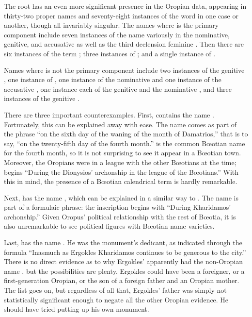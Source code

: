 The root  has an even more significant presence in the Oropian data,
appearing in thirty-two proper names and seventy-eight instances of the word  in one case or another,
though all invariably singular.
The names where  is the primary component include seven instances of the name  variously in the nominative, genitive, and accusative
as well as the third declension feminine .
Then there are six instances of the term ;
three instances of ;
and a single instance of .
	
Names where  is not the primary component include two instances of the genitive ,
one instance of ,
one instance of the nominative 
and one instance of the accusative ,
one instance each of the genitive  and the nominative ,
and three instances of the genitive .
	
There are three important counterexamples.
First,
 contains the name .
Fortunately,
this can be explained away with ease.
The name comes as part of the phrase 
``on the sixth day of the waning of the month of Damatrios,''
that is to say,
``on the twenty-fifth day of the fourth month.''
 is the common Bœotian name for the fourth month,
so it is not surprising to see it appear in a Bœotian town.
Moreover,
the Oropians were in a league with the other Bœotians at the time;
 begins 
``During the Dionysios' archonship in the league of the Bœotians.''
With this in mind,
the presence of a Bœotian calendrical term is hardly remarkable.

	
Next,
 has the name ,
which can be explained in a similar way to .
The name is part of a formulaic phrase:
the inscription begins with 
``During Kharidamos' archonship.''
Given Oropus' political relationship with the rest of Bœotia,
it is also unremarkable to see political figures with Bœotian name varieties.
	
Last,
 has the name .
He was the monument's dedicant,
as indicated through the formula 
``Inasmuch as Ergokles Kharidamos continues to be generous to the city.''
There is no direct evidence as to why Ergokles' apparently had the non-Oropian name ,
but the possibilities are plenty.
Ergokles could have been a foreigner,
or a first-generation Oropian,
or the son of a foreign father and an Oropian mother.
The list goes on,
but regardless of all that,
Ergokles' father was simply not statistically significant enough to negate all the other Oropian evidence.
He should have tried putting up his own monument.
	
